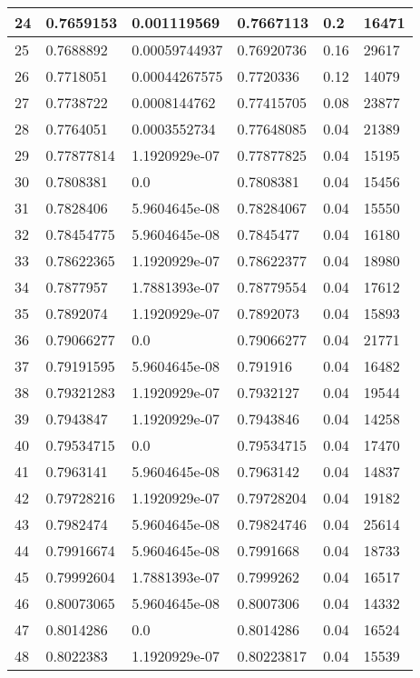 \begin{longtable}{|l|l|l|l|l|l|}
24 & 0.7659153 & 0.001119569 & 0.7667113 & 0.2 & 16471 \\ \hline 
25 & 0.7688892 & 0.00059744937 & 0.76920736 & 0.16 & 29617 \\ \hline 
26 & 0.7718051 & 0.00044267575 & 0.7720336 & 0.12 & 14079 \\ \hline 
27 & 0.7738722 & 0.0008144762 & 0.77415705 & 0.08 & 23877 \\ \hline 
28 & 0.7764051 & 0.0003552734 & 0.77648085 & 0.04 & 21389 \\ \hline 
29 & 0.77877814 & 1.1920929e-07 & 0.77877825 & 0.04 & 15195 \\ \hline 
30 & 0.7808381 & 0.0 & 0.7808381 & 0.04 & 15456 \\ \hline 
31 & 0.7828406 & 5.9604645e-08 & 0.78284067 & 0.04 & 15550 \\ \hline 
32 & 0.78454775 & 5.9604645e-08 & 0.7845477 & 0.04 & 16180 \\ \hline 
33 & 0.78622365 & 1.1920929e-07 & 0.78622377 & 0.04 & 18980 \\ \hline 
34 & 0.7877957 & 1.7881393e-07 & 0.78779554 & 0.04 & 17612 \\ \hline 
35 & 0.7892074 & 1.1920929e-07 & 0.7892073 & 0.04 & 15893 \\ \hline 
36 & 0.79066277 & 0.0 & 0.79066277 & 0.04 & 21771 \\ \hline 
37 & 0.79191595 & 5.9604645e-08 & 0.791916 & 0.04 & 16482 \\ \hline 
38 & 0.79321283 & 1.1920929e-07 & 0.7932127 & 0.04 & 19544 \\ \hline 
39 & 0.7943847 & 1.1920929e-07 & 0.7943846 & 0.04 & 14258 \\ \hline 
40 & 0.79534715 & 0.0 & 0.79534715 & 0.04 & 17470 \\ \hline 
41 & 0.7963141 & 5.9604645e-08 & 0.7963142 & 0.04 & 14837 \\ \hline 
42 & 0.79728216 & 1.1920929e-07 & 0.79728204 & 0.04 & 19182 \\ \hline 
43 & 0.7982474 & 5.9604645e-08 & 0.79824746 & 0.04 & 25614 \\ \hline 
44 & 0.79916674 & 5.9604645e-08 & 0.7991668 & 0.04 & 18733 \\ \hline 
45 & 0.79992604 & 1.7881393e-07 & 0.7999262 & 0.04 & 16517 \\ \hline 
46 & 0.80073065 & 5.9604645e-08 & 0.8007306 & 0.04 & 14332 \\ \hline 
47 & 0.8014286 & 0.0 & 0.8014286 & 0.04 & 16524 \\ \hline 
48 & 0.8022383 & 1.1920929e-07 & 0.80223817 & 0.04 & 15539 \\ \hline 

\end{longtable}
